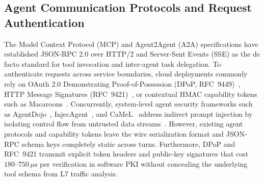 \documentclass[conference,10pt]{IEEEtran}
\begin{document}
\subsection{Agent Communication Protocols and Request Authentication}
The Model Context Protocol (MCP) and Agent2Agent (A2A) specifications have established JSON-RPC 2.0 over HTTP/2 and Server-Sent Events (SSE) as the de facto standard for tool invocation and inter-agent task delegation. To authenticate requests across service boundaries, cloud deployments commonly rely on OAuth 2.0 Demonstrating Proof-of-Possession (DPoP, RFC~9449)~\cite{fett2023dpop}, HTTP Message Signatures (RFC~9421)~\cite{backman2024rfc9421}, or contextual HMAC capability tokens such as Macaroons~\cite{birgisson2014macaroons}. Concurrently, system-level agent security frameworks such as AgentDojo~\cite{debenedetti2024agentdojo}, InjecAgent~\cite{zhan2024injecagent}, and CaMeL~\cite{debenedetti2025camel} address indirect prompt injection by isolating control flow from untrusted data streams~\cite{greshake2023not}. However, existing agent protocols and capability tokens leave the wire serialization format and JSON-RPC schema keys completely static across turns. Furthermore, DPoP and RFC~9421 transmit explicit token headers and public-key signatures that cost $180$--$750\,\mu\text{s}$ per verification in software PKI without concealing the underlying tool schema from L7 traffic analysis.
\end{document}
